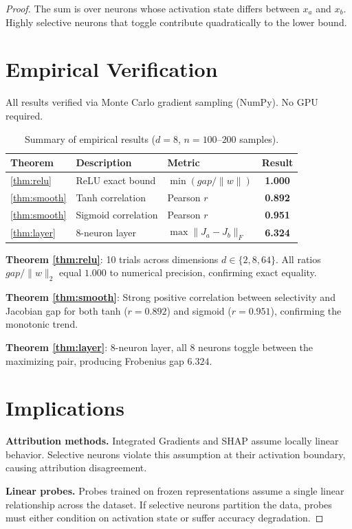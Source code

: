 \documentclass[11pt,a4paper]{amsart}
\theoremstyle{plain}
\theoremstyle{definition}
\begin{document}
\begin{proof}
The sum is over neurons whose activation state differs between $x_a$
and $x_b$. Highly selective neurons that toggle contribute quadratically
to the lower bound.

\section{Empirical Verification}

All results verified via Monte Carlo gradient sampling (NumPy). No
GPU required.

\begin{table}[h]
\centering
\begin{tabular}{@{}lllc@{}}
\toprule
Theorem & Description & Metric & Result \\
\midrule
\ref{thm:relu} & ReLU exact bound & $\min(gap/\|w\|)$ & \textbf{1.000} \\
\ref{thm:smooth} & Tanh correlation & Pearson $r$ & \textbf{0.892} \\
\ref{thm:smooth} & Sigmoid correlation & Pearson $r$ & \textbf{0.951} \\
\ref{thm:layer} & 8-neuron layer & $\max\|J_a-J_b\|_F$ & \textbf{6.324} \\
\bottomrule
\end{tabular}
\caption{Summary of empirical results ($d=8$, $n=100$--$200$ samples).}
\end{table}

\textbf{Theorem \ref{thm:relu}}: 10 trials across dimensions
$d\in\{2,8,64\}$. All ratios $gap/\|w\|_2$ equal $1.000$ to numerical
precision, confirming exact equality.

\textbf{Theorem \ref{thm:smooth}}: Strong positive correlation between
selectivity and Jacobian gap for both tanh ($r=0.892$) and sigmoid
($r=0.951$), confirming the monotonic trend.

\textbf{Theorem \ref{thm:layer}}: 8-neuron layer, all 8 neurons toggle
between the maximizing pair, producing Frobenius gap $6.324$.

\section{Implications}

\textbf{Attribution methods.} Integrated Gradients and SHAP assume
locally linear behavior. Selective neurons violate this assumption
at their activation boundary, causing attribution disagreement.

\textbf{Linear probes.} Probes trained on frozen representations
assume a single linear relationship across the dataset. If selective
neurons partition the data, probes must either condition on activation
state or suffer accuracy degradation.


\end{proof}
\end{document}
